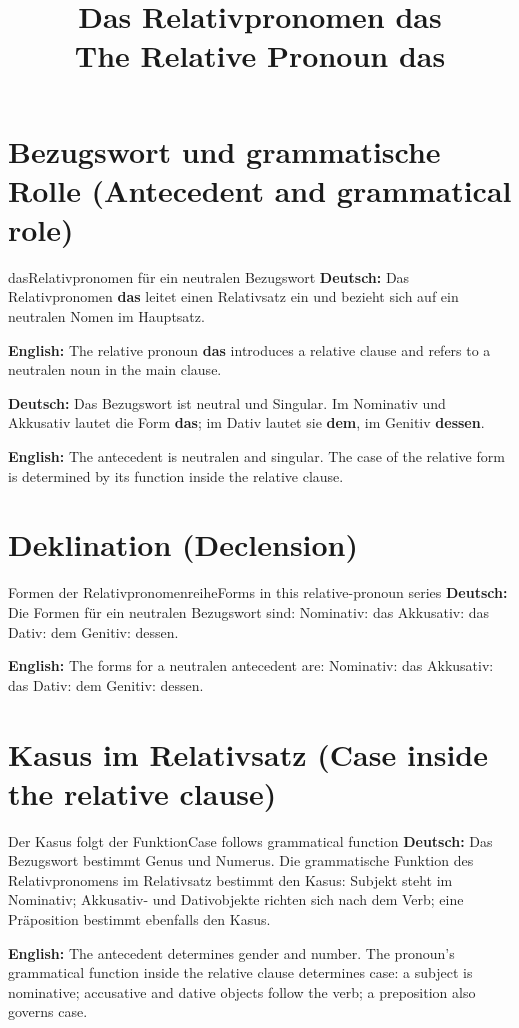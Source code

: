 \documentclass[a4paper,11pt]{article}
\title{Das Relativpronomen \glqq das\grqq{}\\\large The Relative Pronoun \glqq das\grqq{}}
\date{}
\newcommand{\GermanText}[1]{\textbf{Deutsch: }#1\par}
\newcommand{\EnglishText}[1]{{\small\color{SoftGray}\textbf{English: }#1\par}}
\begin{document}
\maketitle
\tableofcontents
\newpage

\section{Bezugswort und grammatische Rolle (Antecedent and grammatical role)}
\begin{grammarentry}{das}{Relativpronomen für ein neutralen Bezugswort}
\GermanText{Das Relativpronomen \textbf{das} leitet einen Relativsatz ein und bezieht sich auf ein neutralen Nomen im Hauptsatz.}
\EnglishText{The relative pronoun \textbf{das} introduces a relative clause and refers to a neutralen noun in the main clause.}
\GermanText{Das Bezugswort ist neutral und Singular. Im Nominativ und Akkusativ lautet die Form \textbf{das}; im Dativ lautet sie \textbf{dem}, im Genitiv \textbf{dessen}.}
\EnglishText{The antecedent is neutralen and singular. The case of the relative form is determined by its function inside the relative clause.}
\end{grammarentry}

\section{Deklination (Declension)}
\begin{grammarentry}{Formen der Relativpronomenreihe}{Forms in this relative-pronoun series}
\GermanText{Die Formen für ein neutralen Bezugswort sind: Nominativ: das \quad Akkusativ: das \quad Dativ: dem \quad Genitiv: dessen.}
\EnglishText{The forms for a neutralen antecedent are: Nominativ: das \quad Akkusativ: das \quad Dativ: dem \quad Genitiv: dessen.}
\end{grammarentry}

\section{Kasus im Relativsatz (Case inside the relative clause)}
\begin{grammarentry}{Der Kasus folgt der Funktion}{Case follows grammatical function}
\GermanText{Das Bezugswort bestimmt Genus und Numerus. Die grammatische Funktion des Relativpronomens im Relativsatz bestimmt den Kasus: Subjekt steht im Nominativ; Akkusativ- und Dativobjekte richten sich nach dem Verb; eine Präposition bestimmt ebenfalls den Kasus.}
\EnglishText{The antecedent determines gender and number. The pronoun's grammatical function inside the relative clause determines case: a subject is nominative; accusative and dative objects follow the verb; a preposition also governs case.}
\end{grammarentry}
\end{document}
